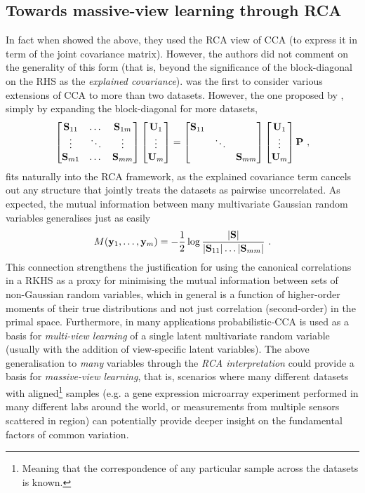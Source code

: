     \subsection{Towards massive-view learning through RCA}
    
      In fact when \citet{Bach:kica02} showed the above, they used the RCA view of CCA (to express it in term of the joint covariance matrix). However, the authors did not comment on the generality of this form (that is, beyond the significance of the block-diagonal on the RHS as the \emph{explained covariance}). \citet{Kettenring:canonical71} was the first to consider various extensions of CCA to more than two datasets. However, the one proposed by \citet[appendix A.2]{Bach:kica02}, simply by expanding the block-diagonal for more datasets,
	\[
	    \begin{bmatrix} \mathbf{S}_{11} &\dots &\mathbf{S}_{1m} \\ \vdots &\ddots &\vdots \\ \mathbf{S}_{m1} &\dots &\mathbf{S}_{mm} \end{bmatrix} \begin{bmatrix}  \mathbf{U}_1 \\ \vdots \\ \mathbf{U}_m  \end{bmatrix} = \begin{bmatrix}  \mathbf{S}_{11} & & \\ &\ddots & \\ & &\mathbf{S}_{mm}  \end{bmatrix} \begin{bmatrix}  \mathbf{U}_1 \\ \vdots \\ \mathbf{U}_m  \end{bmatrix} \mathbf{P} ~,
	\]
	fits naturally into the RCA framework, as the explained covariance term cancels out any structure that jointly treats the datasets as pairwise uncorrelated. As expected, the mutual information between many multivariate Gaussian random variables generalises just as easily
	\[
	  M(\mathbf{y}_1, \dots, \mathbf{y}_m) = - \frac{1}{2} \log \frac{\lvert  \mathbf{S} \rvert }{ \lvert \mathbf{S}_{11} \rvert \dots \lvert \mathbf{S}_{mm} \rvert } ~.
	\]
	This connection strengthens the justification for using the canonical correlations in a RKHS as a proxy for minimising the mutual information between sets of non-Gaussian random variables, which in general is a function of higher-order moments of their true distributions and not just correlation (second-order) in the primal space. Furthermore, in many applications probabilistic-CCA is used as a basis for \emph{multi-view learning} of a single latent multivariate random variable (usually with the addition of view-specific latent variables).
	The above generalisation to \emph{many} variables through the \textit{RCA interpretation} could provide a basis for \emph{massive-view learning}, that is, scenarios where many different datasets with aligned\footnote{Meaning that the correspondence of any particular sample across the datasets is known.} samples (e.g. a gene expression microarray experiment performed in many different labs around the world, or measurements from multiple sensors scattered in region) can potentially provide deeper insight on the fundamental factors of common variation.
	
